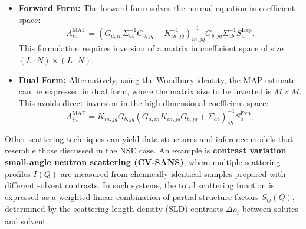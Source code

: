 \documentclass[12pt]{article}
\begin{document}
\begin{itemize}
    \item \textbf{Forward Form:} The forward form solves the normal equation in coefficient space:
    \begin{equation}
        A^{\mathrm{MAP}}_{in} = \left( G_{a,in} \Sigma^{-1}_{ab} G_{b,jq} + K^{-1}_{in,jq} \right)^{-1}_{in,jq} G_{b,jq} \Sigma^{-1}_{ab} S_a^{\mathrm{Exp}}.
        \label{eq:MAP_forward}
    \end{equation}
    This formulation requires inversion of a matrix in coefficient space of size \( (L \cdot N) \times (L \cdot N) \).

    \item \textbf{Dual Form:} Alternatively, using the Woodbury identity, the MAP estimate can be expressed in dual form, where the matrix size to be inverted is \(M\times M\). This avoids direct inversion in the high-dimensional coefficient space:
    \begin{equation}
        A^{\mathrm{MAP}}_{in} = K_{in,jq} G_{b,jq} \left( G_{a,in} K_{in,jq} G_{b,jq} + \Sigma_{ab} \right)^{-1}_{ab} S_a^{\mathrm{Exp}},
        \label{eq:MAP_dual}
    \end{equation}
\end{itemize}

Other scattering techniques can yield data structures and inference models that resemble those discussed in the NSE case. An example is \textbf{contrast variation small-angle neutron scattering (CV-SANS)}, where multiple scattering profiles \( I(Q) \) are measured from chemically identical samples prepared with different solvent contrasts. In such systems, the total scattering function is expressed as a weighted linear combination of partial structure factors \( S_{ij}(Q) \), determined by the scattering length density (SLD) contrasts \( \Delta \rho_i \) between solutes and solvent. 
\end{document}
